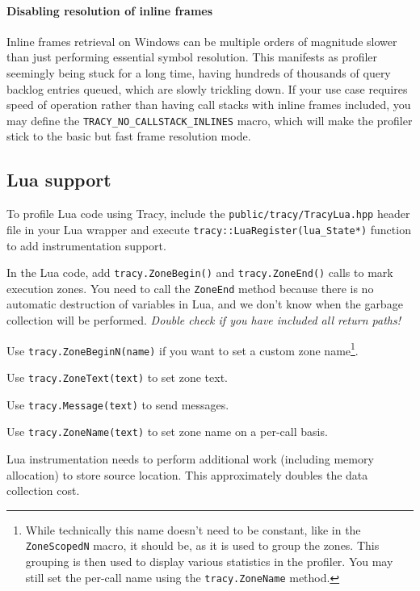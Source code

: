 \documentclass[hidelinks,titlepage,a4paper]{article}
\begin{document}
\paragraph{Disabling resolution of inline frames}

Inline frames retrieval on Windows can be multiple orders of magnitude slower than just performing essential symbol resolution. This manifests as profiler seemingly being stuck for a long time, having hundreds of thousands of query backlog entries queued, which are slowly trickling down. If your use case requires speed of operation rather than having call stacks with inline frames included, you may define the \texttt{TRACY\_NO\_CALLSTACK\_INLINES} macro, which will make the profiler stick to the basic but fast frame resolution mode.

\subsection{Lua support}

To profile Lua code using Tracy, include the \texttt{public/tracy/TracyLua.hpp} header file in your Lua wrapper and execute \texttt{tracy::LuaRegister(lua\_State*)} function to add instrumentation support.

In the Lua code, add \texttt{tracy.ZoneBegin()} and \texttt{tracy.ZoneEnd()} calls to mark execution zones. You need to call the \texttt{ZoneEnd} method because there is no automatic destruction of variables in Lua, and we don't know when the garbage collection will be performed. \emph{Double check if you have included all return paths!}

Use \texttt{tracy.ZoneBeginN(name)} if you want to set a custom zone name\footnote{While technically this name doesn't need to be constant, like in the \texttt{ZoneScopedN} macro, it should be, as it is used to group the zones. This grouping is then used to display various statistics in the profiler. You may still set the per-call name using the \texttt{tracy.ZoneName} method.}.

Use \texttt{tracy.ZoneText(text)} to set zone text.

Use \texttt{tracy.Message(text)} to send messages.

Use \texttt{tracy.ZoneName(text)} to set zone name on a per-call basis.

Lua instrumentation needs to perform additional work (including memory allocation) to store source location. This approximately doubles the data collection cost.
\end{document}
